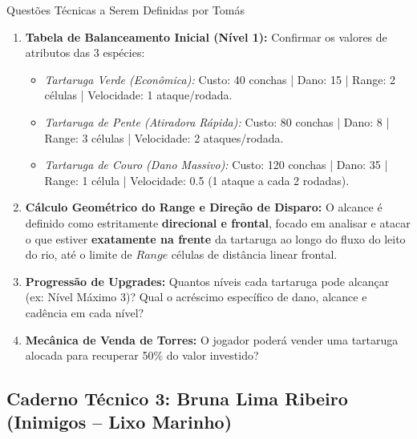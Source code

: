 \documentclass[11pt,a4paper]{article}
\begin{document}
\begin{perguntaBox}{Questões Técnicas a Serem Definidas por Tomás}
\begin{enumerate}
  \item \textbf{Tabela de Balanceamento Inicial (Nível 1):} Confirmar os valores de atributos das 3 espécies:
  \begin{itemize}
    \item \textit{Tartaruga Verde (Econômica):} Custo: 40 conchas | Dano: 15 | Range: 2 células | Velocidade: 1 ataque/rodada.
    \item \textit{Tartaruga de Pente (Atiradora Rápida):} Custo: 80 conchas | Dano: 8 | Range: 3 células | Velocidade: 2 ataques/rodada.
    \item \textit{Tartaruga de Couro (Dano Massivo):} Custo: 120 conchas | Dano: 35 | Range: 1 célula | Velocidade: 0.5 (1 ataque a cada 2 rodadas).
  \end{itemize}
  \item \textbf{Cálculo Geométrico do Range e Direção de Disparo:} O alcance é definido como estritamente \textbf{direcional e frontal}, focado em analisar e atacar o que estiver \textbf{exatamente na frente} da tartaruga ao longo do fluxo do leito do rio, até o limite de $Range$ células de distância linear frontal.
  \item \textbf{Progressão de Upgrades:} Quantos níveis cada tartaruga pode alcançar (ex: Nível Máximo 3)? Qual o acréscimo específico de dano, alcance e cadência em cada nível?
  \item \textbf{Mecânica de Venda de Torres:} O jogador poderá vender uma tartaruga alocada para recuperar 50\% do valor investido?
\end{enumerate}
\end{perguntaBox}

\subsection{Caderno Técnico 3: Bruna Lima Ribeiro (Inimigos -- Lixo Marinho)}
\end{document}
